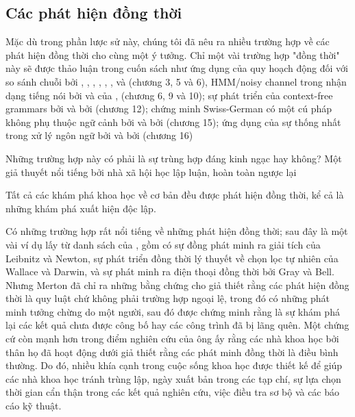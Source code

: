 \subsection{Các phát hiện đồng thời}

Mặc dù trong phần lược sử này, chúng tôi đã nêu ra nhiều trường hợp về các phát hiện đồng thời cho cùng một ý tưởng. Chỉ một vài trường hợp "đồng thời" này sẽ được thảo luận trong cuốn sách như ứng dụng của quy hoạch động đối với so sánh chuỗi bởi \citet{viterbi1967error}, \citet{vintsyuk1968speech}, \citet{needleman1970general}, \citet{sakoe1971dynamic}, \citet{sankoff1972matching}, \citet{reichert1973application}, và \citet{wagner1974string} (chương 3, 5 và 6), HMM/noisy channel trong nhận dạng tiếng nói bởi \citet{baker1990stochastic} và của \citet{jelinek1976continuous}, \citet{bahl1986maximum} (chương 6, 9 và 10); sự phát triển của context-free grammars bởi \citet{chomsky1963formal} và bởi \citet{backus1959syntax} (chương 12); chứng minh Swiss-German có một cú pháp không phụ thuộc ngữ cảnh bởi \citet{huybregts1984weak} và bởi \citet{shieber1985evidence} (chương 15); ứng dụng của sự thống nhất trong xử lý ngôn ngữ bởi \citeauthor{colmerauer1996birth} và bởi \citet{kay1999grammatical} (chương 16)

Những trường hợp này có phải là sự trùng hợp đáng kinh ngạc hay không? Một giả thuyết nổi tiếng bởi nhà xã hội học \citet{merton1961social} lập luận, hoàn toàn ngược lại

\begin{adjustwidth}{1.5cm}{}
Tất cả các khám phá khoa học về cơ bản đều được phát hiện đồng thời, kể cả là những khám phá xuất hiện độc lập.
\end{adjustwidth}

Có những trường hợp rất nổi tiếng về những phát hiện đồng thời; sau đây là một vài ví dụ lấy từ danh sách của \citet{ogburn1922inventions}, gồm có sự đồng phát minh ra giải tích của Leibnitz và Newton, sự phát triển đồng thời lý thuyết về chọn lọc tự nhiên của Wallace và Darwin, và sự phát minh ra điện thoại đồng thời bởi Gray và Bell. Nhưng Merton đã chỉ ra những bằng chứng cho giả thiết rằng các phát hiện đồng thời là quy luật chứ không phải trường hợp ngoại lệ, trong đó có những phát minh tưởng chừng do một người, sau đó được chứng minh rằng là sự khám phá lại các kết quả chưa được công bố hay các công trình đã bị lãng quên. Một chứng cứ còn mạnh hơn trong điểm nghiên cứu của ông ấy rằng các nhà khoa học bởi thân họ đã hoạt động dưới giả thiết rằng các phát minh đồng thời là điều bình thường. Do đó, nhiều khía cạnh trong cuộc sống khoa học được thiết kế để giúp các nhà khoa học tránh trùng lập, ngày xuất bản trong các tạp chí, sự lựa chọn thời gian cẩn thận trong các kết quả nghiên cứu, việc điều tra sơ bộ và các báo cáo kỹ thuật.

